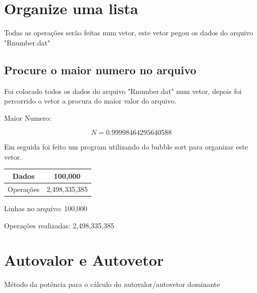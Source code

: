 \documentclass[a4paper, 12pt]{article}
\begin{document}

\section{Organize uma lista}

Todas as operações serão feitas num vetor, este vetor pegou os dados do arquivo "Rnumber.dat"

\subsection{Procure o maior numero no arquivo}

Foi colocado todos os dados do arquivo "Rnumber.dat" num vetor, depois foi percorrido o vetor a procura do maior valor do arquivo.

Maior Numero:

\begin{equation*}
	N = 0.99998464295640588
\end{equation*}

Em seguida foi feito um program utilizando do bubble sort para organizar este vetor. 

\begin{table}
\centering

\begin{tabular}{c | c}
	Dados & 100,000 \\ \hline
	Operações & 2,498,335,385 \\
\end{tabular}
\end{table}

Linhas no arquivo: 100,000

Operações realizadas: 2,498,335,385



\section{Autovalor e Autovetor}

Método da potência para o cálculo do autovalor/autovetor dominante
\end{document}
